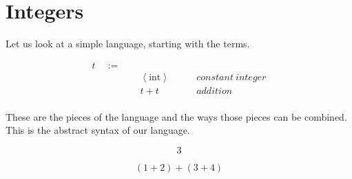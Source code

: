 
\section{Integers}

\begin{frame}[c]
  \begin{center}
    Let us look at a simple language, starting with the terms.
  \end{center}
\end{frame}

\begin{frame}
\begin{mdframed}[frametitle={Terms}]
\begin{displaymath}
    \begin{aligned}
t \quad:=\quad& ~ &\\
  & ~ \left<\text{int}\right> \quad\quad &constant~integer\\
  & ~ t + t \quad\quad &addition\\
    \end{aligned}
  \end{displaymath}
\end{mdframed}

  \medskip

\begin{overprint}
\onslide<+>
These are the pieces of the language and the ways those pieces can be combined.
\onslide<+>
This is the abstract syntax of our language.
\end{overprint}
\end{frame}

\begin{frame}
\begin{displaymath}
  3 
\end{displaymath}
\end{frame}

\begin{frame}
\begin{displaymath}
  (1 + 2) + (3 + 4)
\end{displaymath}
\end{frame}

